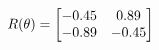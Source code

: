 \documentclass[preview]{standalone}
\begin{document}
\begin{align*}
\special{dvisvgm:raw <g id='unique000'>}R(\theta) = \begin{bmatrix}-0.45 & 0.89\\-0.89 & -0.45\end{bmatrix}\special{dvisvgm:raw </g>}
\end{align*}
\end{document}
